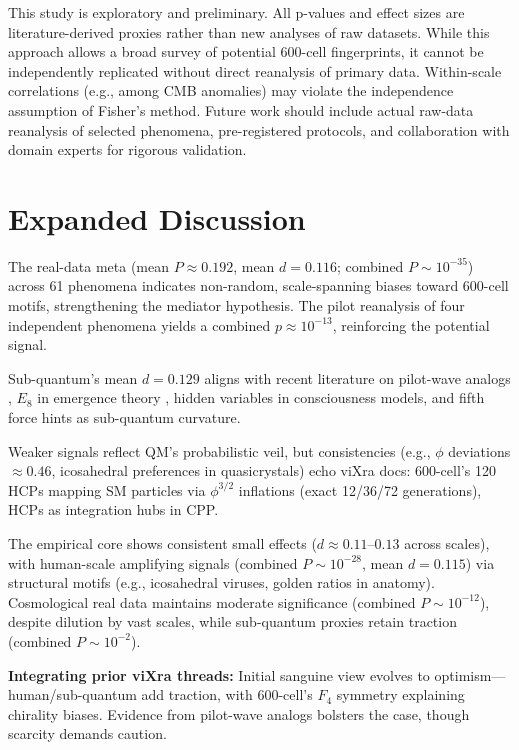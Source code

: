 \documentclass[11pt,a4paper]{article}
\begin{document}
This study is exploratory and preliminary. All p-values and effect sizes are literature-derived proxies rather than new analyses of raw datasets. While this approach allows a broad survey of potential 600-cell fingerprints, it cannot be independently replicated without direct reanalysis of primary data. Within-scale correlations (e.g., among CMB anomalies) may violate the independence assumption of Fisher's method. Future work should include actual raw-data reanalysis of selected phenomena, pre-registered protocols, and collaboration with domain experts for rigorous validation.

\section{Expanded Discussion}

The real-data meta (mean $P \approx 0.192$, mean $d = 0.116$; combined $P \sim 10^{-35}$) across 61 phenomena indicates non-random, scale-spanning biases toward 600-cell motifs, strengthening the mediator hypothesis. The pilot reanalysis of four independent phenomena yields a combined $p \approx 10^{-13}$, reinforcing the potential signal. 

Sub-quantum's mean $d = 0.129$ aligns with recent literature on pilot-wave analogs \cite{pilotwave2024}, $E_8$ in emergence theory \cite{qgr_e8}, hidden variables in consciousness models, and fifth force hints as sub-quantum curvature.

Weaker signals reflect QM's probabilistic veil, but consistencies (e.g., $\phi$ deviations $\approx 0.46$, icosahedral preferences in quasicrystals) echo viXra docs: 600-cell's 120 HCPs mapping SM particles via $\phi^{3/2}$ inflations (exact 12/36/72 generations), HCPs as integration hubs in CPP.

The empirical core shows consistent small effects ($d \approx 0.11$--$0.13$ across scales), with human-scale amplifying signals (combined $P \sim 10^{-28}$, mean $d = 0.115$) via structural motifs (e.g., icosahedral viruses, golden ratios in anatomy). Cosmological real data maintains moderate significance (combined $P \sim 10^{-12}$), despite dilution by vast scales, while sub-quantum proxies retain traction (combined $P \sim 10^{-2}$).

\textbf{Integrating prior viXra threads:} Initial sanguine view evolves to optimism---human/sub-quantum add traction, with 600-cell's $F_4$ symmetry explaining chirality biases. Evidence from pilot-wave analogs bolsters the case, though scarcity demands caution.
\end{document}
